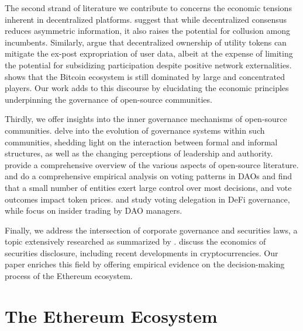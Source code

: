 \documentclass[No]{AEA}
\begin{document}
The second strand of literature we contribute to concerns the economic tensions inherent in decentralized platforms. \cite{Cong_Zhiguo2019} suggest that while decentralized consensus reduces asymmetric information, it also raises the potential for collusion among incumbents. Similarly, \cite{Sockin_Xiong2023} argue that decentralized ownership of utility tokens can mitigate the ex-post expropriation of user data, albeit at the expense of limiting the potential for subsidizing participation despite positive network externalities. \cite{MakarovSchoar22} shows that the Bitcoin ecosystem is still dominated by large and concentrated players. Our work adds to this discourse by elucidating the economic principles underpinning the governance of open-source communities. 

Thirdly, we offer insights into the inner governance mechanisms of open-source communities. \cite{Mahony_Ferraro2007} delve into the evolution of governance systems within such communities, shedding light on the interaction between formal and informal structures, as well as the changing perceptions of leadership and authority. \cite{LernerTirole2005} provide a comprehensive overview of the various aspects of open-source literature. \cite{AppelGrennan2023} and \cite{Appel-Grennan2024} do a comprehensive empirical analysis on voting patterns in DAOs and find that a small number of entities exert large control over most decisions, and vote outcomes impact token prices. \cite{Fan-et-al2025} and \cite{Bongaerts-et-al2025} study voting delegation in DeFi governance, while \cite{Cong-et-al2025} focus on insider trading by DAO managers.  

Finally, we address the intersection of corporate governance and securities laws, a topic extensively researched as summarized by \cite{Mahoney2009}. \cite{Choi_Pritchard2019} discuss the economics of securities disclosure, including recent developments in cryptocurrencies. Our paper enriches this field by offering empirical evidence on the decision-making process of the Ethereum ecosystem.


\section{The Ethereum Ecosystem}
\end{document}
